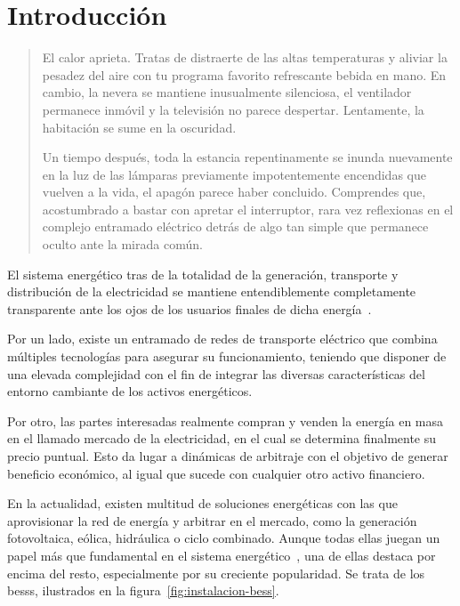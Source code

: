 \cleardoublepage

\chapter{Introducción}
\label{makereference1}

\begin{quotation}

  El calor aprieta. Tratas de distraerte de las altas temperaturas y aliviar la pesadez del aire con tu programa favorito refrescante bebida en mano. En cambio, la nevera se mantiene inusualmente silenciosa, el ventilador permanece inmóvil y la televisión no parece despertar. Lentamente, la habitación se sume en la oscuridad.

  Un tiempo después, toda la estancia repentinamente se inunda nuevamente en la luz de las lámparas previamente impotentemente encendidas que vuelven a la vida, el apagón parece haber concluido. Comprendes que, acostumbrado a bastar con apretar el interruptor, rara vez reflexionas en el complejo entramado eléctrico detrás de algo tan simple que permanece oculto ante la mirada común.

\end{quotation}

El sistema energético tras de la totalidad de la generación, transporte y distribución de la electricidad se mantiene entendiblemente completamente transparente ante los ojos de los usuarios finales de dicha energía~\cite{garrues2009red}.

Por un lado, existe un entramado de redes de transporte eléctrico que combina múltiples tecnologías para asegurar su funcionamiento, teniendo que disponer de una elevada complejidad con el fin de integrar las diversas características del entorno cambiante de los activos energéticos.

Por otro, las partes interesadas realmente compran y venden la energía en masa en el llamado mercado de la electricidad, en el cual se determina finalmente su precio puntual. Esto da lugar a dinámicas de arbitraje con el objetivo de generar beneficio económico, al igual que sucede con cualquier otro activo financiero.

En la actualidad, existen multitud de soluciones energéticas con las que aprovisionar la red de energía y arbitrar en el mercado, como la generación fotovoltaica, eólica, hidráulica o ciclo combinado. Aunque todas ellas juegan un papel más que fundamental en el sistema energético~\cite{turkenburg2000renewable}, una de ellas destaca por encima del resto, especialmente por su creciente popularidad. Se trata de los \glspl{bess}, ilustrados en la figura~\ref{fig:instalacion-bess}.

